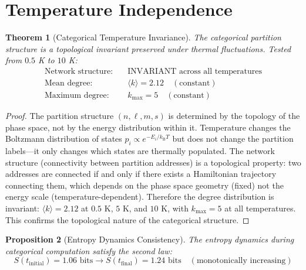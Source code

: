 \documentclass[12pt]{article}
\newtheorem{theorem}{Theorem}[section]
\newtheorem{proposition}[theorem]{Proposition}
\theoremstyle{definition}
\theoremstyle{remark}
\newcommand{\kB}{k_{\mathrm{B}}}
\begin{document}
\section{Temperature Independence}
\label{sec:temperature}

\begin{theorem}[Categorical Temperature Invariance]
\label{thm:temperature}
The categorical partition structure is a topological invariant preserved under thermal fluctuations. Tested from $0.5$ K to $10$ K:
\begin{align}
\text{Network structure:} &\quad \text{INVARIANT across all temperatures} \label{eq:temp_invariant} \\
\text{Mean degree:} &\quad \langle k \rangle = 2.12 \quad (\text{constant}) \label{eq:mean_degree} \\
\text{Maximum degree:} &\quad k_{\mathrm{max}} = 5 \quad (\text{constant}) \label{eq:max_degree}
\end{align}
\end{theorem}

\begin{proof}
The partition structure $(n, \ell, m, s)$ is determined by the topology of the phase space, not by the energy distribution within it. Temperature changes the Boltzmann distribution of states $p_i \propto e^{-E_i/\kB T}$ but does not change the partition labels---it only changes which states are thermally populated. The network structure (connectivity between partition addresses) is a topological property: two addresses are connected if and only if there exists a Hamiltonian trajectory connecting them, which depends on the phase space geometry (fixed) not the energy scale (temperature-dependent). Therefore the degree distribution is invariant: $\langle k \rangle = 2.12$ at $0.5$ K, $5$ K, and $10$ K, with $k_{\mathrm{max}} = 5$ at all temperatures. This confirms the topological nature of the categorical structure. \qedhere
\end{proof}

\begin{proposition}[Entropy Dynamics Consistency]
\label{prop:entropy_dynamics}
The entropy dynamics during categorical computation satisfy the second law:
\begin{equation}
\label{eq:entropy_dynamics}
S(t_{\mathrm{initial}}) = 1.06 \text{ bits} \to S(t_{\mathrm{final}}) = 1.24 \text{ bits} \quad (\text{monotonically increasing})
\end{equation}
\end{proposition}
\end{document}
